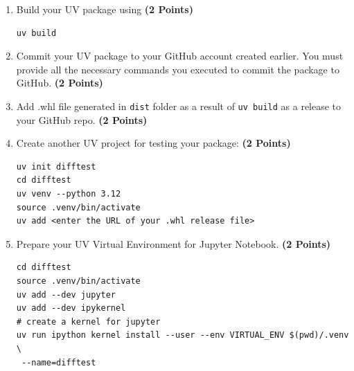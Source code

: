 \documentclass[12pt, xcolor=dvipsnames,svgnames,x11names]{article}
\begin{document}
\begin{enumerate}
$$
v(t) = \frac{x(t_k) - x(t_{k-1})}{t_k - t_{k-1}}.
$$

For this purpose, assume that the function \texttt{diff} takes two Python arrays as input (do not use Numpy Array) of equal length: (i) The first array should be the time value $t_k$, $k$ is the index of time; (ii) The second array should be the signal value $x$. The function should be able to check for the equality of lengths. The function should return the computed discrete derivative $v(t)$ as a Python array. Make sure to add an inline comment to the function as shown in the example in the code snippet included in the Lecture slides. \hfill \textbf{(10 Points)}

It is your responsibility to make sure that the function is \textit{importable}. See Lecture Slides 2 for the reference.

\item Build your UV package using \hfill \textbf{(2 Points)}

\begin{verbatim}
uv build
\end{verbatim}

\item Commit your UV package to your GitHub account created earlier. You must provide all the necessary commands you executed to commit the package to GitHub. \hfill \textbf{(2 Points)}

\item Add .whl file generated in \texttt{dist} folder as a result of \texttt{uv build} as a release to your GitHub repo. \hfill \textbf{(2 Points)}

\item Create another UV project for testing your package: \hfill \textbf{(2 Points)}

\begin{verbatim}
uv init difftest
cd difftest
uv venv --python 3.12
source .venv/bin/activate
uv add <enter the URL of your .whl release file>
\end{verbatim}

\item Prepare your UV Virtual Environment for Jupyter Notebook. \hfill \textbf{(2 Points)}

\begin{verbatim}
cd difftest
source .venv/bin/activate
uv add --dev jupyter
uv add --dev ipykernel
# create a kernel for jupyter
uv run ipython kernel install --user --env VIRTUAL_ENV $(pwd)/.venv \
 --name=difftest


\end{verbatim}
\end{enumerate}
\end{document}
